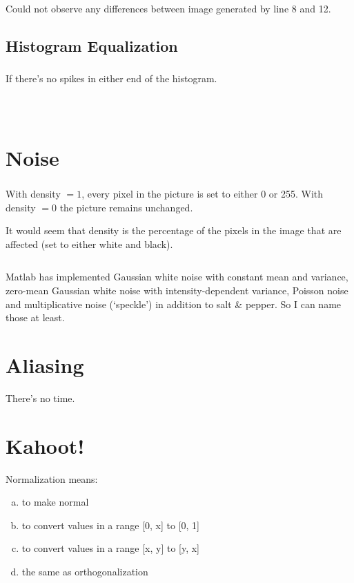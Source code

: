 \inputminted[linenos=true]{octave}{../code/exercise04-1.m}

Could not observe any differences between image generated by line 8 and 12.

\subsection{Histogram Equalization}
\subsubsection{}
If there's no spikes in either end of the histogram.

\subsubsection{}
\inputminted[linenos=true]{octave}{../code/exercise04-2.m}

\subsubsection{}
\inputminted[linenos=true]{octave}{../code/exercise04-3.m}

\section{Noise}
\subsubsection{}
With density $= 1$, every pixel in the picture is set to either 0 or 255.
With density $= 0$ the picture remains unchanged.

It would seem that density is the percentage of the pixels in the image that are affected (set to either white and black).
\inputminted[linenos=true]{octave}{../code/exercise05.m}

Matlab has implemented Gaussian white noise with constant mean and variance, zero-mean Gaussian white noise with intensity-dependent variance, Poisson noise and multiplicative noise (`speckle') in addition to salt \& pepper.
So I can name those at least.

\section{Aliasing}
There's no time.


\section{Kahoot!}

Normalization means:
\begin{enumerate}[(a)]
    \item to make normal
    \item to convert values in a range [0, x] to [0, 1]
    \item to convert values in a range [x, y] to [y, x]
    \item the same as orthogonalization
\end{enumerate}


